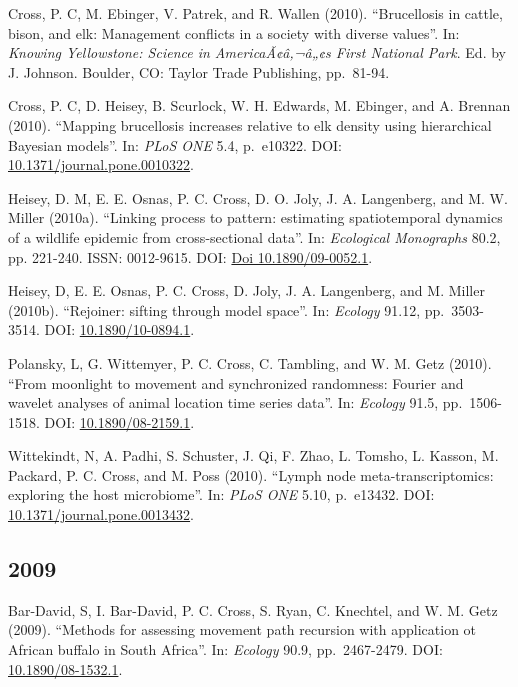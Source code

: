 \documentclass[12pt,]{article}
\begin{document}
Cross, P. C, M. Ebinger, V. Patrek, and R. Wallen (2010). ``Brucellosis
in cattle, bison, and elk: Management conflicts in a society with
diverse values''. In: \emph{Knowing Yellowstone: Science in
AmericaÃ¢â‚¬â„¢s First National Park}. Ed. by J. Johnson. Boulder, CO:
Taylor Trade Publishing, pp.~81-94.

Cross, P. C, D. Heisey, B. Scurlock, W. H. Edwards, M. Ebinger, and A.
Brennan (2010). ``Mapping brucellosis increases relative to elk density
using hierarchical Bayesian models''. In: \emph{PLoS ONE} 5.4,
p.~e10322. DOI:
\href{https://doi.org/10.1371\%2Fjournal.pone.0010322}{10.1371/journal.pone.0010322}.

Heisey, D. M, E. E. Osnas, P. C. Cross, D. O. Joly, J. A. Langenberg,
and M. W. Miller (2010a). ``Linking process to pattern: estimating
spatiotemporal dynamics of a wildlife epidemic from cross-sectional
data''. In: \emph{Ecological Monographs} 80.2, pp. 221-240. ISSN:
0012-9615. DOI: \href{https://doi.org/Doi\%2010.1890\%2F09-0052.1}{Doi
10.1890/09-0052.1}.

Heisey, D, E. E. Osnas, P. C. Cross, D. Joly, J. A. Langenberg, and M.
Miller (2010b). ``Rejoiner: sifting through model space''. In:
\emph{Ecology} 91.12, pp.~3503-3514. DOI:
\href{https://doi.org/10.1890\%2F10-0894.1}{10.1890/10-0894.1}.

Polansky, L, G. Wittemyer, P. C. Cross, C. Tambling, and W. M. Getz
(2010). ``From moonlight to movement and synchronized randomness:
Fourier and wavelet analyses of animal location time series data''. In:
\emph{Ecology} 91.5, pp.~1506-1518. DOI:
\href{https://doi.org/10.1890\%2F08-2159.1}{10.1890/08-2159.1}.

Wittekindt, N, A. Padhi, S. Schuster, J. Qi, F. Zhao, L. Tomsho, L.
Kasson, M. Packard, P. C. Cross, and M. Poss (2010). ``Lymph node
meta-transcriptomics: exploring the host microbiome''. In: \emph{PLoS
ONE} 5.10, p.~e13432. DOI:
\href{https://doi.org/10.1371\%2Fjournal.pone.0013432}{10.1371/journal.pone.0013432}.

\hypertarget{section-10}{%
\subsection{2009}\label{section-10}}

Bar-David, S, I. Bar-David, P. C. Cross, S. Ryan, C. Knechtel, and W. M.
Getz (2009). ``Methods for assessing movement path recursion with
application ot African buffalo in South Africa''. In: \emph{Ecology}
90.9, pp.~2467-2479. DOI:
\href{https://doi.org/10.1890\%2F08-1532.1}{10.1890/08-1532.1}.
\end{document}
